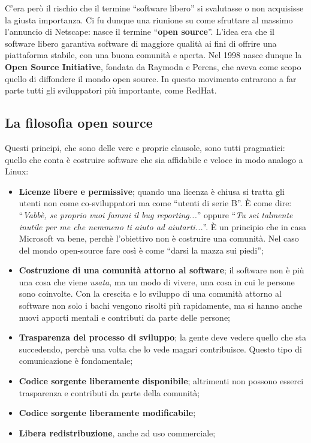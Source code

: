 C'era però il rischio che il termine ``software libero'' si svalutasse o non acquisisse la giusta importanza. Ci fu dunque una riunione su come sfruttare al massimo l'annuncio di Netscape: nasce il termine ``\textbf{open source}''. L'idea era che il software libero garantiva software di maggiore qualità ai fini di offrire una piattaforma stabile, con una buona comunità e aperta. Nel 1998 nasce dunque la \textbf{Open Source Initiative}, fondata da Raymodn e Perens, che aveva come scopo quello di diffondere il mondo open source. In questo movimento entrarono a far parte tutti gli sviluppatori più importante, come RedHat. 

\subsection{La filosofia open source}

Questi principi, che sono delle vere e proprie clausole, sono tutti pragmatici: quello che conta è costruire software che sia affidabile e veloce in modo analogo a Linux:

\begin{itemize}

\item \textbf{Licenze libere e permissive}; quando una licenza è chiusa si tratta gli utenti non come co-sviluppatori ma come ``utenti di serie B''. È come dire: ``\textit{Vabbè, se proprio vuoi fammi il bug reporting...}'' oppure ``\textit{Tu sei talmente inutile per me che nemmeno ti aiuto ad aiutarti...}''. È un principio che in casa Microsoft va bene, perchè l'obiettivo non è costruire una comunità. Nel caso del mondo open-source fare così è come ``darsi la mazza sui piedi'';
\item \textbf{Costruzione di una comunità attorno al software}; il software non è più una cosa che viene \textit{usata}, ma un modo di vivere, una cosa in cui le persone sono coinvolte. Con la crescita e lo sviluppo di una comunità attorno al software non solo i bachi vengono risolti più rapidamente, ma si hanno anche nuovi apporti mentali e contributi da parte delle persone;
\item \textbf{Trasparenza del processo di sviluppo}; la gente deve vedere quello che sta succedendo, perchè una volta che lo vede magari contribuisce. Questo tipo di comunicazione è fondamentale;
\item \textbf{Codice sorgente liberamente disponibile}; altrimenti non possono esserci trasparenza e contributi da parte della comunità;
\item \textbf{Codice sorgente liberamente modificabile};
\item \textbf{Libera redistribuzione}, anche ad uso commerciale;

\end{itemize}

